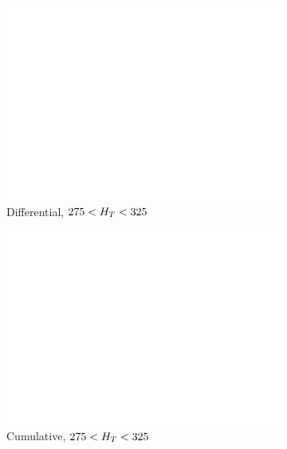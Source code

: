 \begin{figure}[p!]
\begin{subfigure}[b]{0.48\textwidth}
      \includegraphics[width=\textwidth,page=11]{Figs/trigger/HT275_325_73_73_36_AlphaT_ge4j_RunAtFNAL}
      \caption{Differential, $275 < H_T < 325 $~\gev}
    \end{subfigure}
    \begin{subfigure}[b]{0.48\textwidth}
      \includegraphics[width=\textwidth,page=18]{Figs/trigger/HT275_325_73_73_36_AlphaT_ge4j_RunAtFNAL}
      \caption{Cumulative, $275 < H_T < 325 $~\gev}
    \end{subfigure} \\
    \begin{subfigure}[b]{0.48\textwidth}

\end{subfigure}
\end{figure}

